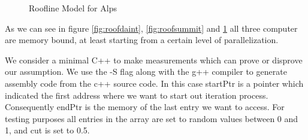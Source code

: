 \documentclass[]{article}
\begin{document}
\begin{figure}[H]
	\begin{center}
	\end{center}
	\caption{Roofline Model for Alps}
	\label{fig:roofalps}
\end{figure}

As we can see in figure \ref{fig:roofdaint}, \ref{fig:roofsummit} and \ref{fig:roofalps} all three computer are memory bound, at least starting from a certain level of parallelization.

We consider a minimal C++ to make measurements which can prove or disprove our assumption. We use the -S flag along with the g++ compiler to generate assembly code from the c++ source code. In this case startPtr is a pointer which indicated the first address where we want to start out iteration process. Consequently endPtr is the memory of the last entry we want to access. For testing purposes all entries in the array are set to random values between 0 and 1, and cut is set to 0.5. 
\end{document}
